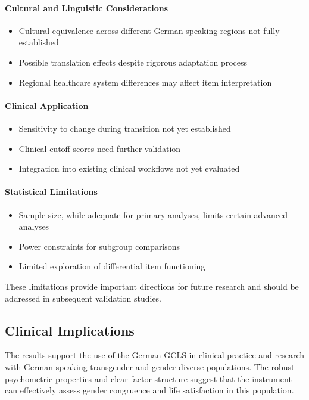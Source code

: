 \documentclass[12pt,a4paper]{article}
\begin{document}
\paragraph{Cultural and Linguistic Considerations}
\begin{itemize}
\item Cultural equivalence across different German-speaking regions not fully established
\item Possible translation effects despite rigorous adaptation process
\item Regional healthcare system differences may affect item interpretation
\end{itemize}

\paragraph{Clinical Application}
\begin{itemize}
\item Sensitivity to change during transition not yet established
\item Clinical cutoff scores need further validation
\item Integration into existing clinical workflows not yet evaluated
\end{itemize}

\paragraph{Statistical Limitations}
\begin{itemize}
\item Sample size, while adequate for primary analyses, limits certain advanced analyses
\item Power constraints for subgroup comparisons
\item Limited exploration of differential item functioning
\end{itemize}

These limitations provide important directions for future research and should be addressed in subsequent validation studies.

\subsection{Clinical Implications}

The results support the use of the German GCLS in clinical practice and research with German-speaking transgender and gender diverse populations. The robust psychometric properties and clear factor structure suggest that the instrument can effectively assess gender congruence and life satisfaction in this population.
\end{document}
